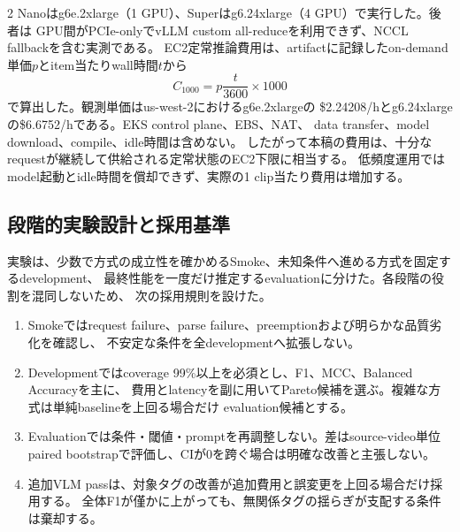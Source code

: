 \documentclass[9pt,a4paper]{extarticle}
\begin{document}
\begin{multicols}{2}
Nanoはg6e.2xlarge（1 GPU）、Superはg6.24xlarge（4 GPU）で実行した。後者は
GPU間がPCIe-onlyでvLLM custom all-reduceを利用できず、NCCL fallbackを含む実測である。
EC2定常推論費用は、artifactに記録したon-demand単価$p$とitem当たりwall時間$t$から
\[
 C_{1000}=p\frac{t}{3600}\times 1000
\]
で算出した。観測単価はus-west-2におけるg6e.2xlargeの
\$2.24208/hとg6.24xlargeの\$6.6752/hである。EKS control plane、EBS、NAT、
data transfer、model download、compile、idle時間は含めない。
したがって本稿の費用は、十分なrequestが継続して供給される定常状態のEC2下限に相当する。
低頻度運用ではmodel起動とidle時間を償却できず、実際の1 clip当たり費用は増加する。

\subsection{段階的実験設計と採用基準}
実験は、少数で方式の成立性を確かめるSmoke、未知条件へ進める方式を固定するdevelopment、
最終性能を一度だけ推定するevaluationに分けた。各段階の役割を混同しないため、
次の採用規則を設けた。
\begin{enumerate}
  \item Smokeではrequest failure、parse failure、preemptionおよび明らかな品質劣化を確認し、
        不安定な条件を全developmentへ拡張しない。
  \item Developmentではcoverage 99\%以上を必須とし、F1、MCC、Balanced Accuracyを主に、
        費用とlatencyを副に用いてPareto候補を選ぶ。複雑な方式は単純baselineを上回る場合だけ
        evaluation候補とする。
  \item Evaluationでは条件・閾値・promptを再調整しない。差はsource-video単位paired
        bootstrapで評価し、CIが0を跨ぐ場合は明確な改善と主張しない。
  \item 追加VLM passは、対象タグの改善が追加費用と誤変更を上回る場合だけ採用する。
        全体F1が僅かに上がっても、無関係タグの揺らぎが支配する条件は棄却する。
\end{enumerate}


\end{multicols}
\end{document}
